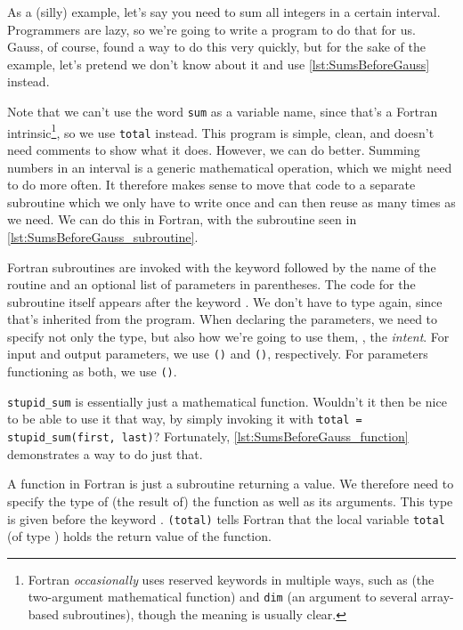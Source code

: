 As a (silly) example, let's say you need to sum all integers in a certain interval.
Programmers are lazy, so we're going to write a program to do that for us.
Gauss, of course, found a way to do this very quickly, but for the sake of the example, let's pretend we don't know about it and use \autoref{lst:SumsBeforeGauss} instead.

Note that we can't use the word \texttt{sum} as a variable name, since that's a Fortran intrinsic\footnote{Fortran \emph{occasionally} uses reserved keywords in multiple ways, such as  (the two-argument mathematical function) and \texttt{dim} (an argument to several array-based subroutines), though the meaning is usually clear.}, so we use \texttt{total} instead.
This program is simple, clean, and doesn't need comments to show what it does.
However, we can do better.
Summing numbers in an interval is a generic mathematical operation, which we might need to do more often.
It therefore makes sense to move that code to a separate subroutine which we only have to write once and can then reuse as many times as we need.
We can do this in Fortran, with the subroutine seen in \autoref{lst:SumsBeforeGauss_subroutine}.

Fortran subroutines are invoked with the keyword  followed by the name of the routine and an optional list of parameters in parentheses.
The code for the subroutine itself appears after the keyword .
We don't have to type  again, since that's inherited from the program.
When declaring the parameters, we need to specify not only the type, but also how we're going to use them, \ie, the \emph{intent}.
For input and output parameters, we use \texttt{()} and \texttt{()}, respectively.
For parameters functioning as both, we use \texttt{()}.

\texttt{stupid\_sum} is essentially just a mathematical function.
Wouldn't it then be nice to be able to use it that way, by simply invoking it with \texttt{total = stupid\_sum(first, last)}?
Fortunately, \autoref{lst:SumsBeforeGauss_function} demonstrates a way to do just that.

A function in Fortran is just a subroutine returning a value.
We therefore need to specify the type of (the result of) the function as well as its arguments.
This type is given before the keyword .
\texttt{(total)} tells Fortran that the local variable \texttt{total} (of type ) holds the return value of the function.

